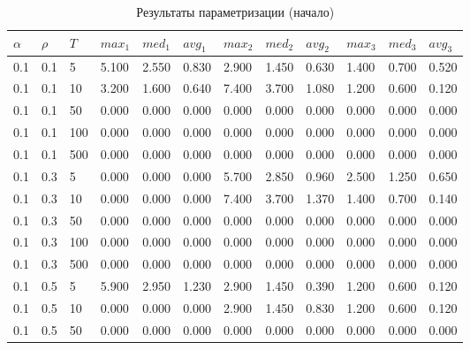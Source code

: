 \documentclass{bmstu}
\begin{document}
	
	\setcounter{page}{69}
	
	\begin{longtable}{|p{}|p{}|p{}|p{}|p{}|p{}|p{}|p{}|p{}|p{}|p{}|p{}|}
		\caption{\label{tab:params0}Результаты параметризации (начало)} \\
		\hline
		$\alpha$ & $\rho$ & $T$ & $max_1$ & $med_1$ & $avg_1$  & $max_2$ & $med_2$ & $avg_2$  & $max_3$ & $med_3$ & $avg_3$ \\
		\hline
		0.1 & 0.1 & 5 & 5.100 & 2.550 & 0.830 & 2.900 & 1.450 & 0.630 & 1.400 & 0.700 & 0.520 \\
		\hline
		0.1 & 0.1 & 10 & 3.200 & 1.600 & 0.640 & 7.400 & 3.700 & 1.080 & 1.200 & 0.600 & 0.120 \\
		\hline
		0.1 & 0.1 & 50 & 0.000 & 0.000 & 0.000 & 0.000 & 0.000 & 0.000 & 0.000 & 0.000 & 0.000 \\
		\hline
		0.1 & 0.1 & 100 & 0.000 & 0.000 & 0.000 & 0.000 & 0.000 & 0.000 & 0.000 & 0.000 & 0.000 \\
		\hline
		0.1 & 0.1 & 500 & 0.000 & 0.000 & 0.000 & 0.000 & 0.000 & 0.000 & 0.000 & 0.000 & 0.000 \\
		\hline
		0.1 & 0.3 & 5 & 0.000 & 0.000 & 0.000 & 5.700 & 2.850 & 0.960 & 2.500 & 1.250 & 0.650 \\
		\hline
		0.1 & 0.3 & 10 & 0.000 & 0.000 & 0.000 & 7.400 & 3.700 & 1.370 & 1.400 & 0.700 & 0.140 \\
		\hline
		0.1 & 0.3 & 50 & 0.000 & 0.000 & 0.000 & 0.000 & 0.000 & 0.000 & 0.000 & 0.000 & 0.000 \\
		\hline
		0.1 & 0.3 & 100 & 0.000 & 0.000 & 0.000 & 0.000 & 0.000 & 0.000 & 0.000 & 0.000 & 0.000 \\
		\hline
		0.1 & 0.3 & 500 & 0.000 & 0.000 & 0.000 & 0.000 & 0.000 & 0.000 & 0.000 & 0.000 & 0.000 \\
		\hline
		0.1 & 0.5 & 5 & 5.900 & 2.950 & 1.230 & 2.900 & 1.450 & 0.390 & 1.200 & 0.600 & 0.120 \\
		\hline
		0.1 & 0.5 & 10 & 0.000 & 0.000 & 0.000 & 2.900 & 1.450 & 0.830 & 1.200 & 0.600 & 0.120 \\
		\hline
		0.1 & 0.5 & 50 & 0.000 & 0.000 & 0.000 & 0.000 & 0.000 & 0.000 & 0.000 & 0.000 & 0.000 \\

\end{longtable}
\end{document}
